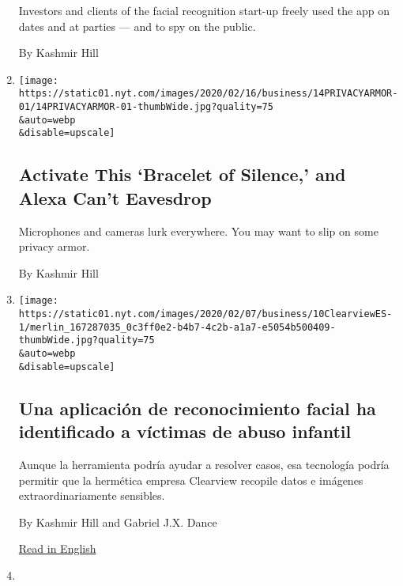 \begin{enumerate}
  Investors and clients of the facial recognition start-up freely used
  the app on dates and at parties --- and to spy on the public.

  By Kashmir Hill
\item
  \href{/2020/02/14/technology/alexa-jamming-bracelet-privacy-armor.html}{}

  \texttt{[image: https://static01.nyt.com/images/2020/02/16/business/14PRIVACYARMOR-01/14PRIVACYARMOR-01-thumbWide.jpg?quality=75\\\&auto=webp\\\&disable=upscale]}

  \hypertarget{activate-this-bracelet-of-silence-and-alexa-cant-eavesdrop}{%
  \subsection{Activate This `Bracelet of Silence,' and Alexa Can't
  Eavesdrop}\label{activate-this-bracelet-of-silence-and-alexa-cant-eavesdrop}}

  Microphones and cameras lurk everywhere. You may want to slip on some
  privacy armor.

  By Kashmir Hill
\item
  \href{/es/2020/02/10/espanol/negocios/clearview-reconocimiento-facial.html}{}

  \texttt{[image: https://static01.nyt.com/images/2020/02/07/business/10ClearviewES-1/merlin\_167287035\_0c3ff0e2-b4b7-4c2b-a1a7-e5054b500409-thumbWide.jpg?quality=75\\\&auto=webp\\\&disable=upscale]}

  \hypertarget{una-aplicaciuxf3n-de-reconocimiento-facial-ha-identificado-a-vuxedctimas-de-abuso-infantil}{%
  \subsection{Una aplicación de reconocimiento facial ha identificado a
  víctimas de abuso
  infantil}\label{una-aplicaciuxf3n-de-reconocimiento-facial-ha-identificado-a-vuxedctimas-de-abuso-infantil}}

  Aunque la herramienta podría ayudar a resolver casos, esa tecnología
  podría permitir que la hermética empresa Clearview recopile datos e
  imágenes extraordinariamente sensibles.

  By Kashmir Hill and Gabriel J.X. Dance

  \href{https://www.nytimes.com/2020/02/07/business/clearview-facial-recognition-child-sexual-abuse.html}{Read
  in English}
\item
  \href{/2020/02/07/business/clearview-facial-recognition-child-sexual-abuse.html}{}


\end{enumerate}
